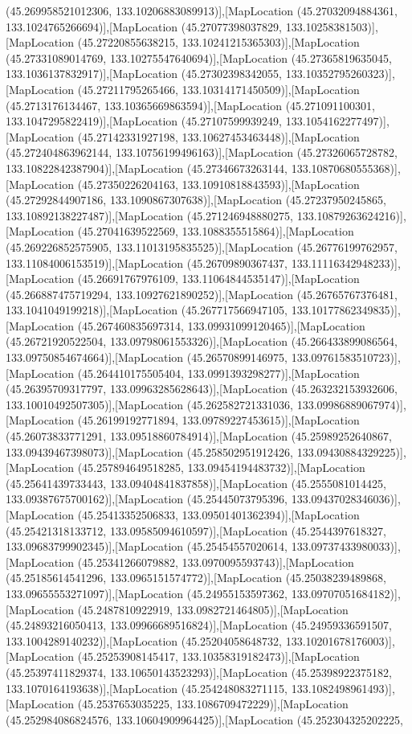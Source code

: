 (45.269958521012306, 133.10206883089913)],[MapLocation (45.27032094884361, 133.1024765266694)],[MapLocation (45.27077398037829, 133.10258381503)],[MapLocation (45.27220855638215, 133.10241215365303)],[MapLocation (45.27331089014769, 133.10275547640694)],[MapLocation (45.27365819635045, 133.1036137832917)],[MapLocation (45.27302398342055, 133.10352795260323)],[MapLocation (45.27211795265466, 133.10314171450509)],[MapLocation (45.2713176134467, 133.10365669863594)],[MapLocation (45.271091100301, 133.1047295822419)],[MapLocation (45.27107599939249, 133.1054162277497)],[MapLocation (45.27142331927198, 133.10627453463448)],[MapLocation (45.272404863962144, 133.10756199496163)],[MapLocation (45.27326065728782, 133.10822842387904)],[MapLocation (45.27346673263144, 133.10870680555368)],[MapLocation (45.27350226204163, 133.10910818843593)],[MapLocation (45.27292844907186, 133.1090867307638)],[MapLocation (45.27237950245865, 133.10892138227487)],[MapLocation (45.271246948880275, 133.10879263624216)],[MapLocation (45.27041639522569, 133.1088355515864)],[MapLocation (45.269226852575905, 133.11013195835525)],[MapLocation (45.26776199762957, 133.11084006153519)],[MapLocation (45.26709890367437, 133.11116342948233)],[MapLocation (45.26691767976109, 133.11064844535147)],[MapLocation (45.266887475719294, 133.10927621890252)],[MapLocation (45.26765767376481, 133.1041049199218)],[MapLocation (45.267717566947105, 133.10177862349835)],[MapLocation (45.267460835697314, 133.09931099120465)],[MapLocation (45.26721920522504, 133.09798061553326)],[MapLocation (45.266433899086564, 133.09750854674664)],[MapLocation (45.26570899146975, 133.09761583510723)],[MapLocation (45.264410175505404, 133.0991393298277)],[MapLocation (45.26395709317797, 133.09963285628643)],[MapLocation (45.263232153932606, 133.10010492507305)],[MapLocation (45.262582721331036, 133.09986889067974)],[MapLocation (45.26199192771894, 133.09789227453615)],[MapLocation (45.26073833771291, 133.09518860784914)],[MapLocation (45.25989252640867, 133.09439467398073)],[MapLocation (45.258502951912426, 133.09430884329225)],[MapLocation (45.257894649518285, 133.09454194483732)],[MapLocation (45.25641439733443, 133.09404841837858)],[MapLocation (45.2555081014425, 133.09387675700162)],[MapLocation (45.25445073795396, 133.09437028346036)],[MapLocation (45.25413352506833, 133.09501401362394)],[MapLocation (45.25421318133712, 133.09585094610597)],[MapLocation (45.2544397618327, 133.09683799902345)],[MapLocation (45.25454557020614, 133.09737433980033)],[MapLocation (45.25341266079882, 133.0970095593743)],[MapLocation (45.25185614541296, 133.0965151574772)],[MapLocation (45.25038239489868, 133.09655553271097)],[MapLocation (45.24955153597362, 133.09707051684182)],[MapLocation (45.2487810922919, 133.0982721464805)],[MapLocation (45.24893216050413, 133.09966689516824)],[MapLocation (45.24959336591507, 133.1004289140232)],[MapLocation (45.25204058648732, 133.10201678176003)],[MapLocation (45.25253908145417, 133.10358319182473)],[MapLocation (45.25397411829374, 133.10650143523293)],[MapLocation (45.25398922375182, 133.1070164193638)],[MapLocation (45.254248083271115, 133.1082498961493)],[MapLocation (45.2537653035225, 133.1086709472229)],[MapLocation (45.252984086824576, 133.10604909964425)],[MapLocation (45.252304325202225, 